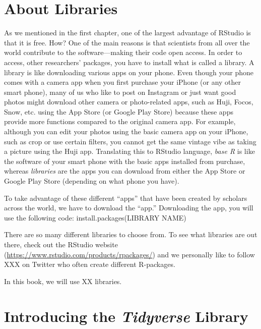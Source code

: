 \documentclass[
]{book}
\begin{document}
\hypertarget{about-libraries}{%
\section{About Libraries}\label{about-libraries}}

As we mentioned in the first chapter, one of the largest advantage of RStudio is that it is free. How? One of the main reasons is that scientists from all over the world contribute to the software---making their code open access. In order to access, other researchers' packages, you have to install what is called a library. A library is like downloading various apps on your phone. Even though your phone comes with a camera app when you first purchase your iPhone (or any other smart phone), many of us who like to post on Instagram or just want good photos might download other camera or photo-related apps, such as Huji, Focos, Snow, etc. using the App Store (or Google Play Store) because these apps provide more functions compared to the original camera app. For example, although you can edit your photos using the basic camera app on your iPhone, such as crop or use certain filters, you cannot get the same vintage vibe as taking a picture using the Huji app. Translating this to RStudio language, \emph{base R} is like the software of your smart phone with the basic apps installed from purchase, whereas \emph{libraries} are the apps you can download from either the App Store or Google Play Store (depending on what phone you have).

To take advantage of these different ``apps'' that have been created by scholars across the world, we have to download the ``app.'' Downloading the app, you will use the following code:
install.packages(LIBRARY NAME)

There are so many different libraries to choose from. To see what libraries are out there, check out the RStudio website (\url{https://www.rstudio.com/products/rpackages/}) and we personally like to follow XXX on Twitter who often create different R-packages.

In this book, we will use XX libraries.

\hypertarget{introducing-the-tidyverse-library}{%
\section{\texorpdfstring{Introducing the \emph{Tidyverse} Library}{Introducing the Tidyverse Library}}\label{introducing-the-tidyverse-library}}
\end{document}
